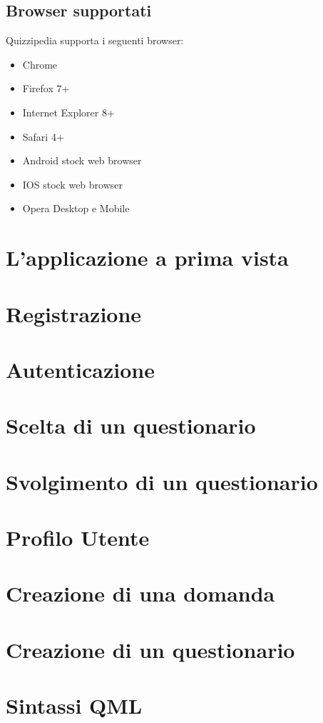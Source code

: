 \documentclass[a4paper,11pt]{article}
\begin{document}
\subsection{Browser supportati}
Quizzipedia supporta i seguenti browser:
\begin{itemize}
	\item Chrome
	\item Firefox 7+
	\item Internet Explorer 8+
	\item Safari 4+
	\item Android stock web browser
	\item IOS stock web browser
	\item Opera Desktop e Mobile
\end{itemize}
	\newpage
	\section{L'applicazione a prima vista}
	\newpage
	\section{Registrazione}
	\newpage
	\section{Autenticazione}
	\newpage
	\section{Scelta di un questionario}
	\newpage
	\section{Svolgimento di un questionario}
	\newpage
	\section{Profilo Utente}
	\newpage
	\section{Creazione di una domanda}
	\newpage
	\section{Creazione di un questionario}
	\newpage
	\section{Sintassi QML}
\end{document}
